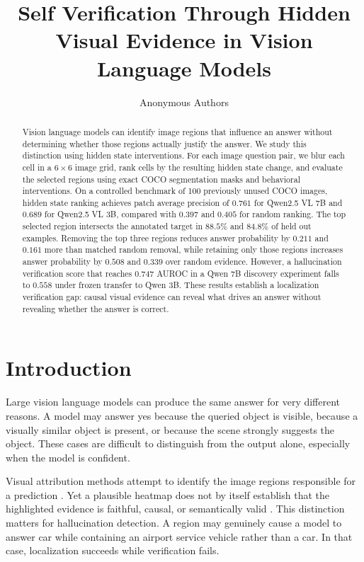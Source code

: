 \documentclass{article}
\title{Self Verification Through Hidden Visual Evidence in Vision Language Models}
\author{Anonymous Authors}
\begin{document}
\maketitle

\begin{abstract}
Vision language models can identify image regions that influence an answer without determining whether those regions actually justify the answer. We study this distinction using hidden state interventions. For each image question pair, we blur each cell in a $6\times6$ image grid, rank cells by the resulting hidden state change, and evaluate the selected regions using exact COCO segmentation masks and behavioral interventions. On a controlled benchmark of 100 previously unused COCO images, hidden state ranking achieves patch average precision of $0.761$ for Qwen2.5 VL 7B and $0.689$ for Qwen2.5 VL 3B, compared with $0.397$ and $0.405$ for random ranking. The top selected region intersects the annotated target in $88.5\%$ and $84.8\%$ of held out examples. Removing the top three regions reduces answer probability by $0.211$ and $0.161$ more than matched random removal, while retaining only those regions increases answer probability by $0.508$ and $0.339$ over random evidence. However, a hallucination verification score that reaches $0.747$ AUROC in a Qwen 7B discovery experiment falls to $0.558$ under frozen transfer to Qwen 3B. These results establish a localization verification gap: causal visual evidence can reveal what drives an answer without revealing whether the answer is correct.
\end{abstract}

\section{Introduction}

Large vision language models can produce the same answer for very different reasons. A model may answer yes because the queried object is visible, because a visually similar object is present, or because the scene strongly suggests the object. These cases are difficult to distinguish from the output alone, especially when the model is confident.

Visual attribution methods attempt to identify the image regions responsible for a prediction \citep{selvaraju2017gradcam,fong2017meaningful}. Yet a plausible heatmap does not by itself establish that the highlighted evidence is faithful, causal, or semantically valid \citep{adebayo2018sanity,jain2019attention,wiegreffe2019attention}. This distinction matters for hallucination detection. A region may genuinely cause a model to answer car while containing an airport service vehicle rather than a car. In that case, localization succeeds while verification fails.
\end{document}
